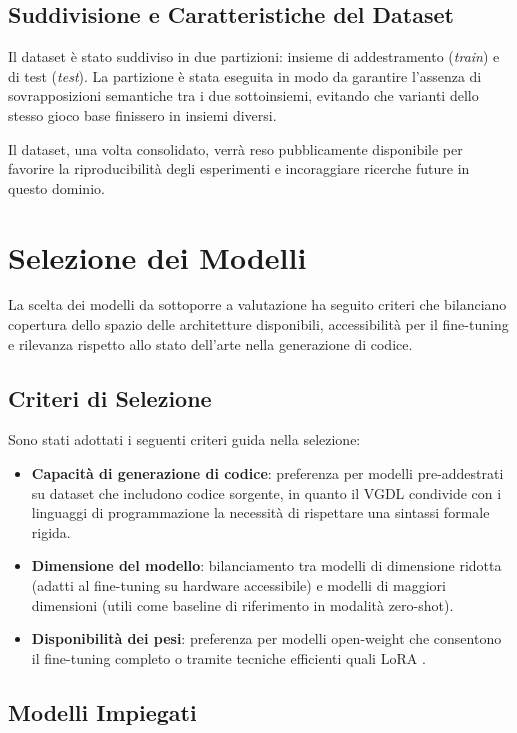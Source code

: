 \documentclass[final,5p,times,twocolumn]{elsarticle}
\begin{document}
\subsection{Suddivisione e Caratteristiche del Dataset}

Il dataset è stato suddiviso in due partizioni: insieme di addestramento (\textit{train}) e di test (\textit{test}). La partizione è stata eseguita in modo da garantire l'assenza di sovrapposizioni semantiche tra i due sottoinsiemi, evitando che varianti dello stesso gioco base finissero in insiemi diversi.

Il dataset, una volta consolidato, verrà reso pubblicamente disponibile per favorire la riproducibilità degli esperimenti e incoraggiare ricerche future in questo dominio.

\section{Selezione dei Modelli}

La scelta dei modelli da sottoporre a valutazione ha seguito criteri che bilanciano copertura dello spazio delle architetture disponibili, accessibilità per il fine-tuning e rilevanza rispetto allo stato dell'arte nella generazione di codice.

\subsection{Criteri di Selezione}

Sono stati adottati i seguenti criteri guida nella selezione:
\begin{itemize}
  \item \textbf{Capacità di generazione di codice}: preferenza per modelli pre-addestrati su dataset che includono codice sorgente, in quanto il VGDL condivide con i linguaggi di programmazione la necessità di rispettare una sintassi formale rigida.
  \item \textbf{Dimensione del modello}: bilanciamento tra modelli di dimensione ridotta (adatti al fine-tuning su hardware accessibile) e modelli di maggiori dimensioni (utili come baseline di riferimento in modalità zero-shot).
  \item \textbf{Disponibilità dei pesi}: preferenza per modelli open-weight che consentono il fine-tuning completo o tramite tecniche efficienti quali LoRA \citep{hu2022lora}.
\end{itemize}


\subsection{Modelli Impiegati}
\end{document}
